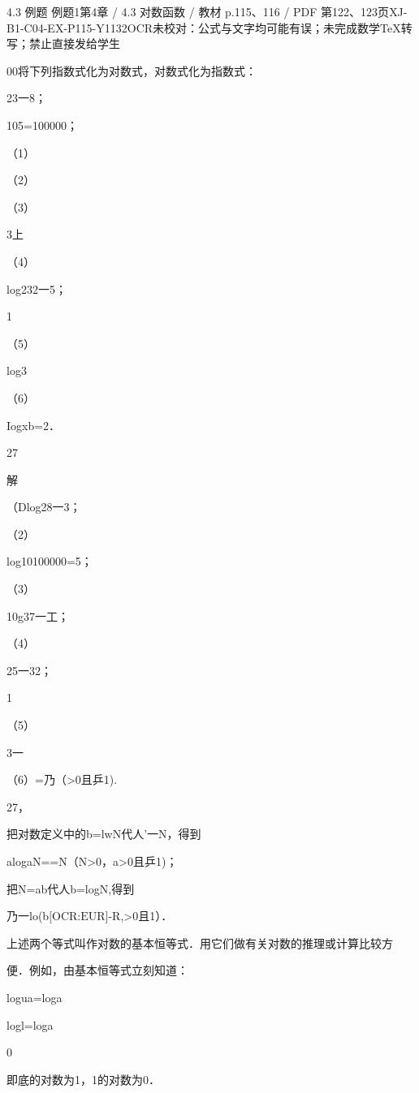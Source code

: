 \begin{bankitem}{4.3 例题 例题1}{第4章 / 4.3 对数函数 / 教材 p.115、116 / PDF 第122、123页}{XJ-B1-C04-EX-P115-Y1132}{OCR未校对：公式与文字均可能有误；未完成数学TeX转写；禁止直接发给学生}
\begin{ocrdraft}
\par
00将下列指数式化为对数式，对数式化为指数式：
\par
23一8；
\par
105=100000；
\par
（1）
\par
（2）
\par
（3）
\par
3上
\par
（4）
\par
log232一5；
\par
1
\par
（5）
\par
log3
\par
（6）
\par
Iogxb=2．
\par
27
\par
解
\par
（Dlog28一3；
\par
（2）
\par
log10100000=5；
\par
（3）
\par
10g37一工；
\par
（4）
\par
25一32；
\par
1
\par
（5）
\par
3一
\par
（6）=乃（>0且乒1).
\par
27，
\par
把对数定义中的b=lwN代人'一N，得到
\par
alogaN==N（N>0，a>0且乒1)；
\par
把N=ab代人b=logN,得到
\par
[教材p.116 / PDF第123页]
\par
乃一lo(b\ensuremath{\text{[OCR:EUR]}}-R,>0且1）．
\par
上述两个等式叫作对数的基本恒等式．用它们做有关对数的推理或计算比较方
\par
便．例如，由基本恒等式立刻知道：
\par
logua=loga
\par
logl=loga
\par
0
\par
即底的对数为1，1的对数为0．
\end{ocrdraft}
\end{bankitem}
